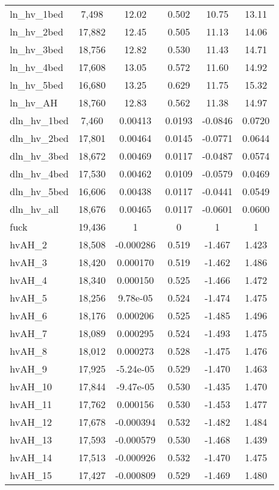 \begin{tabular}{lccccc}
ln\_hv\_1bed & 7,498 & 12.02 & 0.502 & 10.75 & 13.11 \\
ln\_hv\_2bed & 17,882 & 12.45 & 0.505 & 11.13 & 14.06 \\
ln\_hv\_3bed & 18,756 & 12.82 & 0.530 & 11.43 & 14.71 \\
ln\_hv\_4bed & 17,608 & 13.05 & 0.572 & 11.60 & 14.92 \\
ln\_hv\_5bed & 16,680 & 13.25 & 0.629 & 11.75 & 15.32 \\
ln\_hv\_AH & 18,760 & 12.83 & 0.562 & 11.38 & 14.97 \\
dln\_hv\_1bed & 7,460 & 0.00413 & 0.0193 & -0.0846 & 0.0720 \\
dln\_hv\_2bed & 17,801 & 0.00464 & 0.0145 & -0.0771 & 0.0644 \\
dln\_hv\_3bed & 18,672 & 0.00469 & 0.0117 & -0.0487 & 0.0574 \\
dln\_hv\_4bed & 17,530 & 0.00462 & 0.0109 & -0.0579 & 0.0469 \\
dln\_hv\_5bed & 16,606 & 0.00438 & 0.0117 & -0.0441 & 0.0549 \\
dln\_hv\_all & 18,676 & 0.00465 & 0.0117 & -0.0601 & 0.0600 \\
fuck & 19,436 & 1 & 0 & 1 & 1 \\
hvAH\_2 & 18,508 & -0.000286 & 0.519 & -1.467 & 1.423 \\
hvAH\_3 & 18,420 & 0.000170 & 0.519 & -1.462 & 1.486 \\
hvAH\_4 & 18,340 & 0.000150 & 0.525 & -1.466 & 1.472 \\
hvAH\_5 & 18,256 & 9.78e-05 & 0.524 & -1.474 & 1.475 \\
hvAH\_6 & 18,176 & 0.000206 & 0.525 & -1.485 & 1.496 \\
hvAH\_7 & 18,089 & 0.000295 & 0.524 & -1.493 & 1.475 \\
hvAH\_8 & 18,012 & 0.000273 & 0.528 & -1.475 & 1.476 \\
hvAH\_9 & 17,925 & -5.24e-05 & 0.529 & -1.470 & 1.463 \\
hvAH\_10 & 17,844 & -9.47e-05 & 0.530 & -1.435 & 1.470 \\
hvAH\_11 & 17,762 & 0.000156 & 0.530 & -1.453 & 1.477 \\
hvAH\_12 & 17,678 & -0.000394 & 0.532 & -1.482 & 1.484 \\
hvAH\_13 & 17,593 & -0.000579 & 0.530 & -1.468 & 1.439 \\
hvAH\_14 & 17,513 & -0.000926 & 0.532 & -1.470 & 1.475 \\
hvAH\_15 & 17,427 & -0.000809 & 0.529 & -1.469 & 1.480 \\

\end{tabular}
